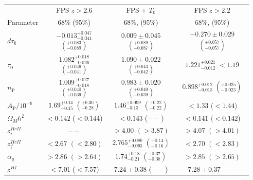 \begin{table}
	\centering
      \def\arraystretch{1.6}
\begin{tabular} {| l | c | c | c|}
\hline
 & FPS $z>2.6$ & FPS + $T_0$ & FPS $z>2.2$ \\
Parameter & 68\% (95\%) & 68\%, (95\%) & 68\%, (95\%)
\\
\hline
$d\tau_0        $ & $-0.013^{+0.047}_{-0.041}$  $\left(^{+0.083}_{-0.089}\right)$                   & $0.009\pm 0.045$            $\left(^{+0.089}_{-0.087}\right)$                   & $-0.270\pm 0.029$     $\left(^{+0.057}_{-0.057}  \right)$   \\
$\tau_0         $ & $1.082^{+0.018}_{-0.026}$  $\left(^{+0.046}_{-0.041}\right)$            & $1.090\pm 0.022$       $\left(^{+0.043}_{-0.042}\right)$                   & $1.221^{+0.021}_{-0.012}$   $< 1.19$   \\
$n_\mathrm{P}   $ & $1.009^{+0.027}_{-0.018}$  $\left(^{+0.040}_{-0.039}\right)$  & $0.983\pm 0.020$  $\left(^{+0.040}_{-0.039}\right)$    & $0.898^{+0.012}_{-0.013}$            $\left(^{+0.025}_{-0.023}\right)$   \\
$A_\mathrm{P}/10^{-9}$ & $1.69^{+0.14}_{-0.15}$        $\left(^{+0.30}_{-0.28}\right)$        & $1.46^{+0.099}_{-0.13}$   $\left(^{+0.22}_{-0.22}\right)$                   &           $< 1.33 $  ($< 1.44$)   \\
$\Omega_M h^2   $ & $< 0.142$ ($< 0.144$)                                              & $< 0.143$  ($--$)                                                                  & $< 0.141$ ($< 0.142$)   \\
$z^{HeII}_i     $ & $--                    $                                           & $> 4.00$   $(> 3.87 ) $                                                            & $> 4.07                    $  $(> 4.01)$   \\
$z^{HeII}_f     $ & $< 2.67                    $  $(< 2.80)$                   & $2.765^{+0.080}_{-0.093}$  $\left(^{+0.14}_{-0.16}\right)$           & $< 2.70                    $    $(< 2.83 )$   \\
$\alpha_{q}     $ & $> 2.86                    $  $(> 2.64)$                   & $1.74^{+0.18}_{-0.21}$  $\left(^{+0.37}_{-0.38}\right)$              & $> 2.85                    $    $(> 2.65 )                   $   \\
$z^{HI}         $ & $< 7.01                    $ ($< 7.57$)                    & $ 7.24\pm 0.38$ ($--$)                            & $7.28\pm 0.37$    $--$   \\

\end{tabular}
\end{table}
